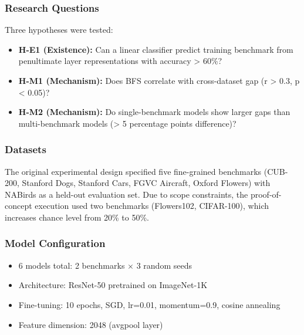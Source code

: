 
\subsubsection{Research Questions}

Three hypotheses were tested:

\begin{itemize}
\item \textbf{H-E1 (Existence):} Can a linear classifier predict training benchmark from penultimate layer representations with accuracy > 60\%?
\item \textbf{H-M1 (Mechanism):} Does BFS correlate with cross-dataset gap (r > 0.3, p < 0.05)?
\item \textbf{H-M2 (Mechanism):} Do single-benchmark models show larger gaps than multi-benchmark models (> 5 percentage points difference)?
\end{itemize}

\subsubsection{Datasets}

\begin{table}[htbp]
\centering
{}
\end{table}

The original experimental design specified five fine-grained benchmarks (CUB-200, Stanford Dogs, Stanford Cars, FGVC Aircraft, Oxford Flowers) with NABirds as a held-out evaluation set. Due to scope constraints, the proof-of-concept execution used two benchmarks (Flowers102, CIFAR-100), which increases chance level from 20\% to 50\%.

\subsubsection{Model Configuration}

\begin{itemize}
\item 6 models total: 2 benchmarks $\times$ 3 random seeds
\item Architecture: ResNet-50 pretrained on ImageNet-1K
\item Fine-tuning: 10 epochs, SGD, lr=0.01, momentum=0.9, cosine annealing
\item Feature dimension: 2048 (avgpool layer)
\end{itemize}


